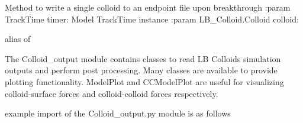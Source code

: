 \documentclass[letterpaper,10pt,english]{sphinxmanual}
\begin{document}
\begin{fulllineitems}

\begin{fulllineitems}
\label{\detokenize{index:lb_colloids.Colloids.Colloid_IO.Output.write_single_colloid}}
Method to write a single colloid to an endpoint file upon breakthrough
:param TrackTime timer: Model TrackTime instance
:param LB\_Colloid.Colloid colloid:

\end{fulllineitems}


\end{fulllineitems}

\label{\detokenize{index:module-lb_colloids}}

\begin{fulllineitems}
\label{\detokenize{index:lb_colloids.ColloidOutput}}
alias of {\hyperref[\detokenize{index:module-lb_colloids.Colloids.Colloid_output}]{}}

\end{fulllineitems}

\label{\detokenize{index:module-lb_colloids.Colloids.Colloid_output}}
The Colloid\_output module contains classes to read LB Colloids simulation
outputs and perform post processing. Many classes are available to
provide plotting functionality. ModelPlot and CCModelPlot are useful for
visualizing colloid-surface forces and colloid-colloid forces respectively.

example import of the Colloid\_output.py module is as follows

\begin{sphinxVerbatim}[commandchars=\\\{\}]
   
   
  
  
 
\end{sphinxVerbatim}
\end{document}
